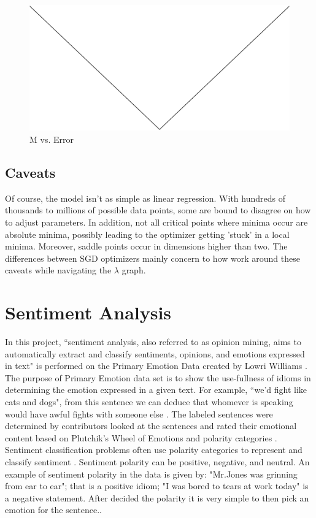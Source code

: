 \documentclass[titlepage,letterpaper]{article}
\begin{document}
	\begin{figure}[h]
	\centering 
	\label{fig:m_vs_error}
	\caption{M vs. Error}
	\includegraphics[scale=.11]{error_function.eps}
	\vspace{-55pt}
	\end{figure}


\subsection{Caveats}
 
 Of course, the model isn't as simple as linear regression. With hundreds of thousands to millions of possible data points, some are bound to disagree on how to adjust parameters. In addition, not all critical points where minima occur are absolute minima, possibly leading to the optimizer  getting 'stuck' in a local minima. Moreover, saddle points occur in dimensions higher than two. The differences between SGD optimizers mainly concern to how work around these caveats while navigating the $\lambda$ graph.
 
\section{Sentiment Analysis}

In this project, ``sentiment analysis, also referred to as opinion mining, aims to automatically extract and classify sentiments, opinions, and emotions expressed in text" is performed on the Primary Emotion Data created by Lowri Williams \cite{lowriwilliams}. The purpose of Primary Emotion data set is to show the use-fullness of idioms in determining the emotion expressed in a given text. For example, ``we'd fight like cats and dogs", from this sentence we can deduce that whomever is speaking would have awful fights with someone else \cite{lowriwilliams}. The labeled sentences were determined by contributors looked at the sentences and rated their emotional content based on Plutchik's Wheel of Emotions and polarity categories \cite{lowriwilliams}. Sentiment classification problems often use polarity categories to represent and classify sentiment \cite{lowriwilliams}. Sentiment polarity can be positive, negative, and neutral. An example of sentiment polarity in the data is given by: "Mr.Jones was grinning from ear to ear"; that is a positive idiom; "I was bored to tears at work today" is a negative statement. After decided the polarity it is very simple to then pick an emotion for the sentence.\cite{lowriwilliams}. 
\end{document}
